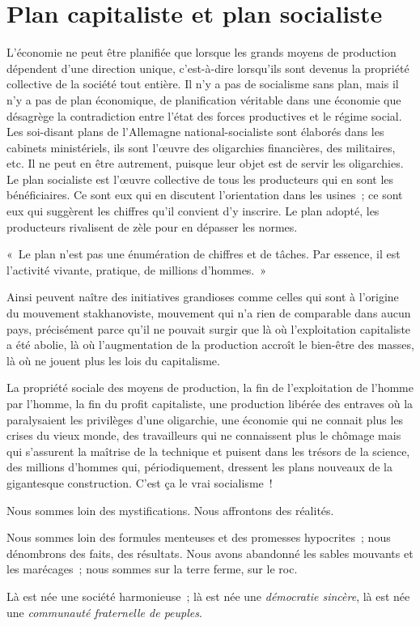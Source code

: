 \documentclass[french,twoside]{book} %
\newcommand{\bibl}[1]{{\RaggedLeft{#1}\par\bigskip}}
\newenvironment{quoteblock}%
  {\begin{quoting}}
  {\end{quoting}}
\newenvironment{quotebar}{%
    \def\FrameCommand{{\color{rubric!10!}\vrule width 0.5em} \hspace{0.9em}}%
    \def\OuterFrameSep{\itemsep} %
    \MakeFramed {\advance\hsize-\width \FrameRestore}
  }%
  {%
    \endMakeFramed
  }
\renewenvironment{quoteblock}%
  {%
    \savenotes
    \setstretch{0.9}
    \normalfont
    \begin{quotebar}
  }
  {%
    \end{quotebar}
    \spewnotes
  }
\begin{document}
\section[Plan capitaliste et plan socialiste]{Plan capitaliste et plan socialiste}
\noindent L’économie ne peut être planifiée que lorsque les grands moyens de production dépendent d’une direction unique, c’est-à-dire lorsqu’ils sont devenus la propriété collective de la société tout entière. Il n’y a pas de socialisme sans plan, mais il n’y a pas de plan économique, de planification véritable dans une économie que désagrège la contradiction entre l’état des forces productives et le régime social. Les soi-disant plans de l’Allemagne national-socialiste sont élaborés dans les cabinets ministériels, ils sont l’œuvre des oligarchies financières, des militaires, etc. Il ne peut en être autrement, puisque leur objet est de servir les oligarchies. Le plan socialiste est l’œuvre collective de tous les producteurs qui en sont les bénéficiaires. Ce sont eux qui en discutent l’orientation dans les usines ; ce sont eux qui suggèrent les chiffres qu’il convient d’y inscrire. Le plan adopté, les producteurs rivalisent de zèle pour en dépasser les normes.\par

\begin{quoteblock}
 \noindent « Le plan n’est pas une énumération de chiffres et de tâches. Par essence, il est l’activité vivante, pratique, de millions d’hommes. »\par
 
\bibl{(Staline)}
 \end{quoteblock}

\noindent Ainsi peuvent naître des initiatives grandioses comme celles qui sont à l’origine du mouvement stakhanoviste, mouvement qui n’a rien de comparable dans aucun pays, précisément parce qu’il ne pouvait surgir que là où l’exploitation capitaliste a été abolie, là où l’augmentation de la production accroît le bien-être des masses, là où ne jouent plus les lois du capitalisme.\par
La propriété sociale des moyens de production, la fin de l’exploitation de l’homme par l’homme, la fin du profit capitaliste, une production libérée des entraves où la paralysaient les privilèges d’une oligarchie, une économie qui ne connait plus les crises du vieux monde, des travailleurs qui ne connaissent plus le chômage mais qui s’assurent la maîtrise de la technique et puisent dans les trésors de la science, des millions d’hommes qui, périodiquement, dressent les plans nouveaux de la gigantesque construction. C’est ça le vrai socialisme !\par
Nous sommes loin des mystifications. Nous affrontons des réalités.\par
Nous sommes loin des formules menteuses et des promesses hypocrites ; nous dénombrons des faits, des résultats. Nous avons abandonné les sables mouvants et les marécages ; nous sommes sur la terre ferme, sur le roc.\par
Là est née une société harmonieuse ; là est née une \emph{démocratie sincère}, là est née une \emph{communauté fraternelle de peuples}.
\end{document}
